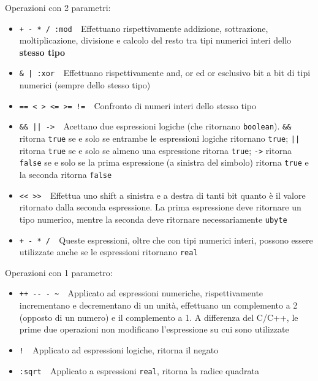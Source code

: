 \documentclass[10pt]{book}%
\newcommand{\e}{\`{e} }
\newcommand{\ac}[1]{\`{#1}}
\newcommand{\code}[1]{\texttt{#1}}
\renewcommand{\emph}[1]{\textbf{#1}}
\begin{document}
Operazioni con 2 parametri:
\begin{itemize}
\item \verb(+ - * / :mod  (Effettuano rispettivamente addizione, sottrazione, moltiplicazione, divisione e calcolo del resto tra tipi numerici interi dello \emph{stesso tipo}
\item \verb+& | :xor  +Effettuano rispettivamente and, or ed or esclusivo bit a bit di tipi numerici (sempre dello stesso tipo)
\item \verb+== < > <= >= !=  +Confronto di numeri interi dello stesso tipo
\item \verb+&& || ->  +Acettano due espressioni logiche (che ritornano \code{boolean}). \verb+&&+ ritorna \code{true} se e solo se entrambe le espressioni logiche ritornano \code{true}; \verb+||+ ritorna \code{true} se e solo se almeno una espressione ritorna \code{true}; \verb+->+ ritorna \code{false} se e solo se la prima espressione (a sinistra del simbolo) ritorna \code{true} e la seconda ritorna \code{false}
\item \verb+<< >>  +Effettua uno shift a sinistra e a destra di tanti bit quanto \e il valore ritornato dalla seconda espressione. La prima espressione deve ritornare un tipo numerico, mentre la seconda deve ritornare necessariamente \code{ubyte}
\item \verb(+ - * /  (Queste espressioni, oltre che con tipi numerici interi, possono essere utilizzate anche se le espressioni ritornano \code{real}
\end{itemize}

Operazioni con 1 parametro:
\begin{itemize}
\item \verb(++ -- - ~  (Applicato ad espressioni numeriche, rispettivamente incrementano e decrementano di un unit\ac a, effettuano un complemento a 2 (opposto di un numero) e il complemento a 1. A differenza del C/C++, le prime due operazioni non modificano l'espressione su cui sono utilizzate
\item \verb+!  +Applicato ad espressioni logiche, ritorna il negato
\item \verb+:sqrt  +Applicato a espressioni \code{real}, ritorna la radice quadrata
\end{itemize}
\end{document}
